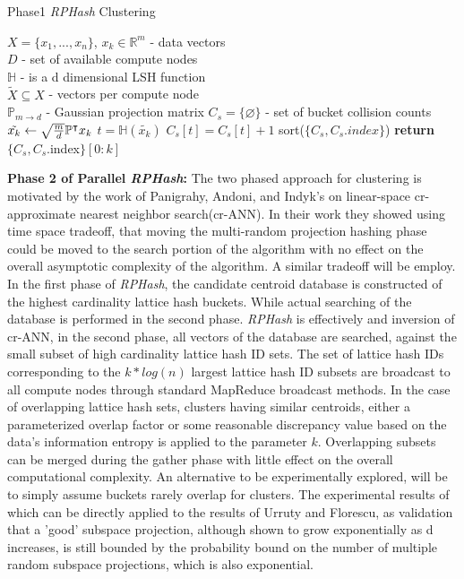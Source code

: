 \documentclass[a4paper,10pt]{article}
\begin{document}
\begin{algorithm}
\caption{Phase1 \emph{RPHash} Clustering}\label{Phase1}
\begin{algorithmic}[1]
\REQUIRE $X=\{x_1,...,x_n\}$, $x_k \in \mathbb{R}^m$ - data vectors\\
 $D$ - set of available compute nodes\\
$\mathbb{H}$ - is a d dimensional LSH function\\
 $\widetilde{X} \subseteq X$ - vectors per compute node\\
 $\mathbb{P}_{m\rightarrow d}$ - Gaussian projection matrix
\STATE $C_s=\{\varnothing\}$ - set of bucket collision counts
\STATE $\tilde{x_k}\leftarrow \sqrt{{m}\over{d}}\mathbb{P}^{\intercal}x_k $
\STATE $t = \mathbb{H}(\tilde{x_k})$
\STATE $C_s[t]=C_s[t]+1$
\ENDFOR
\STATE sort($\{C_s,C_s.index\}$)
\State \textbf{return}$\{C_s,C_s$.index$\} [0 : k]$
\end{algorithmic}
\end{algorithm}





\textbf{Phase 2 of Parallel \emph{RPHash}: } 
The two phased approach
for clustering is motivated by the work of Panigrahy, Andoni, and
Indyk's\cite{panigrahy,Andoni} on linear-space cr-approximate nearest neighbor
search(cr-ANN).  In their work they showed using time space tradeoff, that
moving the multi-random projection hashing phase could be moved to the search
portion of the algorithm with no effect on the overall asymptotic complexity
of the algorithm.  A similar tradeoff will be employ.  In the first phase of
\emph{RPHash},	the candidate centroid database is constructed of the highest
cardinality lattice hash buckets.  While actual searching of the database is
performed in the second phase.	\emph{RPHash} is effectively and inversion
of cr-ANN, in the second phase, all vectors of the database are searched,
against the small subset of high cardinality lattice hash ID sets.  The set
of lattice hash IDs corresponding to the $k*log(n)$ largest lattice hash ID
subsets are broadcast to all compute nodes through standard MapReduce broadcast
methods.  In the case of overlapping lattice hash sets, clusters having similar
centroids, either a parameterized overlap factor or some reasonable discrepancy
value based on the data's information entropy is applied to the parameter $k$.
Overlapping subsets can be merged during the gather phase with little effect
on the overall computational complexity.  An alternative to be experimentally
explored, will be to simply assume buckets rarely overlap for clusters.
The experimental results of which can be directly applied to the results
of Urruty and Florescu, as validation that a 'good' subspace projection,
although shown to grow exponentially as d increases\cite{florescu09}, is
still bounded by the probability bound on the number of multiple random
subspace projections, which is also exponential\cite{Urruty2007}.
\end{document}
